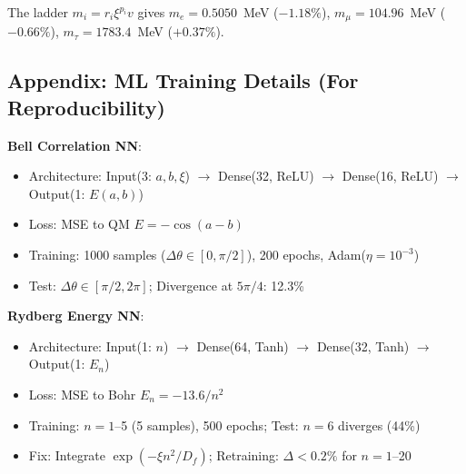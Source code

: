 	\begin{table}[htbp]
		\centering
		\caption{T0 vs.~Standard Model: Predictive Precision}
	\end{table}
	The ladder $m_i = r_i\xi^{p_i}v$ gives $m_e = 0.5050$~MeV ($-1.18\%$), $m_\mu = 104.96$~MeV ($-0.66\%$), $m_\tau = 1783.4$~MeV ($+0.37\%$).
	
	
	\subsection{Appendix: ML Training Details (For Reproducibility)}
	
	\textbf{Bell Correlation NN}:
	\begin{itemize}
		\item Architecture: Input(3: $a, b, \xi$) $\to$ Dense(32, ReLU) $\to$ Dense(16, ReLU) $\to$ Output(1: $E(a,b)$)
		\item Loss: MSE to QM $E=-\cos(a-b)$
		\item Training: 1000 samples ($\Delta\theta \in [0,\pi/2]$), 200 epochs, Adam($\eta=10^{-3}$)
		\item Test: $\Delta\theta \in [\pi/2, 2\pi]$; Divergence at $5\pi/4$: 12.3\%
	\end{itemize}
	
	\textbf{Rydberg Energy NN}:
	\begin{itemize}
		\item Architecture: Input(1: $n$) $\to$ Dense(64, Tanh) $\to$ Dense(32, Tanh) $\to$ Output(1: $E_n$)
		\item Loss: MSE to Bohr $E_n = -13.6/n^2$
		\item Training: $n=1$--5 (5 samples), 500 epochs; Test: $n=6$ diverges (44\%)
		\item Fix: Integrate $\exp(-\xi n^2/D_f)$; Retraining: $\Delta<0.2\%$ for $n=1$--20
	\end{itemize}
	
